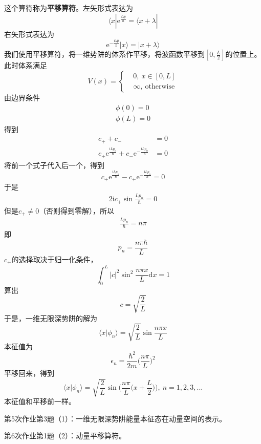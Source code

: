         这个算符称为\textbf{平移算符}。左矢形式表达为
        \[ \langle x| \mathrm{e}^{\frac {\mathrm{i}\lambda \hat{p}}{\hbar}} = \langle x+\lambda| \]
        右矢形式表达为
        \[ \mathrm{e}^{-\frac {\mathrm{i}\lambda \hat{p}}{\hbar}} | x\rangle = |x+\lambda \rangle \]
        我们使用平移算符，将一维势阱的体系作平移，将波函数平移到$[0,\frac L2]$的位置上。此时体系满足
        \begin{equation*}
            V(x) = \left \{
                \begin{aligned}
                    &0,\ x\in [0, L]\\
                    &\infty, \ \mathrm{otherwise}
                \end{aligned}
                \right.
        \end{equation*}
        由边界条件
        \begin{align*}
            \phi(0)= 0\\
            \phi(L) = 0
        \end{align*}
        得到
        \begin{align*}
            c_+ +c_- &= 0\\
            c_+\mathrm{e}^{\frac {\mathrm{i}Lp_n}{\hbar}}+c_-\mathrm{e}^{-\frac {\mathrm{i}Lp_n}{\hbar}} &= 0
        \end{align*}
        将前一个式子代入后一个，得到
        \[ c_+\mathrm{e}^{\frac {\mathrm{i}Lp_n}{\hbar}}-c_+ \mathrm{e}^{-\frac {\mathrm{i}Lp_n}{\hbar}} = 0 \]
        于是
        \begin{align*}
            2\mathrm{i}c_+ \sin{\frac {Lp_n}{\hbar}} = 0
        \end{align*}
        但是$c_+ \neq 0$（否则得到零解），所以
        \begin{align*}
            \frac {Lp_n}{\hbar} = n\pi
        \end{align*}
        即
        \[ p_n = \frac {n\pi \hbar}{L} \]
        $c_+$的选择取决于归一化条件，
        \[ \int_0^L |c|^2 \sin^2{\frac {n\pi x}L}\mathrm{d}x = 1 \]
        算出
        \[ c = \sqrt{\frac 2L} \]
        于是，一维无限深势阱的解为
        \[ \langle x|\phi_n \rangle = \sqrt{\frac 2L} \sin{\frac {n\pi x}L} \]
        本征值为
        \[ \epsilon_n = \frac {\hbar^2}{2m} \bigg(\frac {n\pi}L\bigg)^2 \]
        平移回来，得到
        \[ \langle x|\phi_n \rangle = \sqrt{\frac 2L} \sin{\bigg(\frac {n\pi}L\bigg(x+\frac L2\bigg)\bigg)}, \ n=1,2,3,... \]
        本征值和平移前一样。
        \begin{asg}
            第5次作业第3题（1）：一维无限深势阱能量本征态在动量空间的表示。
        \end{asg}
        \begin{asg}
            第6次作业第1题（2）：动量平移算符。
        \end{asg}

